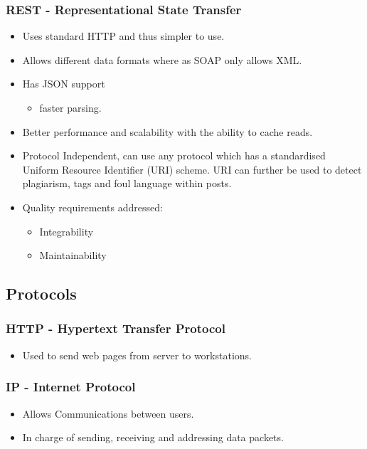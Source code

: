 \documentclass[12pt, oneside]{article}
\begin{document}
		\subsubsection{REST - Representational State Transfer}
		\begin{itemize}
			\item Uses standard HTTP and thus simpler to use.
		 	\item Allows different data formats where as SOAP only allows XML.
			\item Has JSON support
				\begin{itemize}
					\item faster parsing.				
				\end{itemize}			 
			\item Better performance and scalability with the ability to cache reads.
			\item Protocol Independent, can use any protocol which has a standardised Uniform Resource Identifier (URI) scheme. URI can further be used to detect plagiarism, tags and foul language within posts.
			\item Quality requirements addressed:
			\begin{itemize}
				\item Integrability
				\item Maintainability				
			\end{itemize}		
		\end{itemize}
	\subsection{Protocols}
		\subsubsection{HTTP - Hypertext Transfer Protocol}
			\begin{itemize}
				\item Used to send web pages from server to workstations.  
			\end{itemize}
		\subsubsection{IP - Internet Protocol}	
			\begin{itemize}
				\item Allows Communications between users.
				\item In charge of sending, receiving and addressing data packets.
			\end{itemize}				
\end{document}
